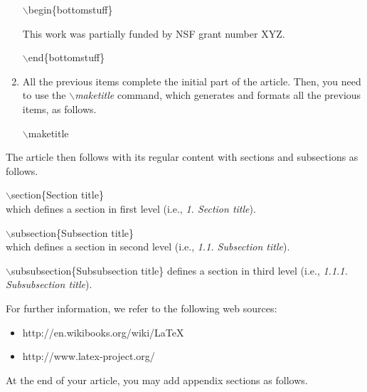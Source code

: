 \documentclass[jidm,a4paper]{jidm} %
\newenvironment{latexcode}
{\ttfamily\vspace{0.1in}\setlength{\parindent}{18pt}}
{\vspace{0.1in}}
\begin{document}
\begin{enumerate}
	\begin{latexcode}
		$\backslash$begin\{bottomstuff\}
	
		This work was partially funded by NSF grant number XYZ. 
	
		$\backslash$end\{bottomstuff\}	
	\end{latexcode}
	
	\item All the previous items complete the initial part of the article. Then, you need to use the \textit{$\backslash$maketitle} command, which generates and formats all the previous items, as follows.
	
		\begin{latexcode}
	   $\backslash$maketitle
	\end{latexcode}
\end{enumerate}


The article then follows with its regular content with sections and subsections as follows.

	\begin{latexcode}
		$\backslash$section\{Section title\} \\
		\rmfamily which defines a section in first level (i.e., \textit{1. Section title}).
	
		\ttfamily$\backslash$subsection\{Subsection title\} \\
		\rmfamily which defines a section in second level (i.e., \textit{1.1. Subsection title}).
	
		\ttfamily$\backslash$subsubsection\{Subsubsection title\} 
		\rmfamily defines a section in third level (i.e., \textit{1.1.1. Subsubsection title}).
	\end{latexcode}

	For further information, we refer to the following web sources:
	
	\ttfamily
\begin{itemize}
	\item http://en.wikibooks.org/wiki/LaTeX
	\item http://www.latex-project.org/
\end{itemize}
	
	\rmfamily


At the end of your article, you may add appendix sections as follows.
\end{document}
